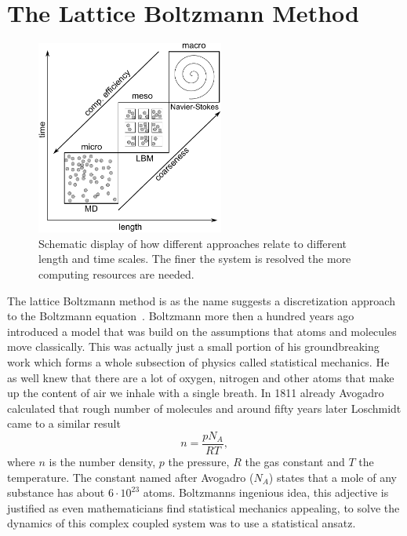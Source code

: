 \section{The Lattice Boltzmann Method}\label{sec:LBM}
\begin{figure}
    \centering
    \includegraphics[width=0.55\textwidth]{graphics/Scales_problem.pdf}
    \caption{Schematic display of how different approaches relate to different length and time scales.
    The finer the system is resolved the more computing resources are needed.}
    \label{fig:scales_dummy}
\end{figure}
The lattice Boltzmann method is as the name suggests a discretization approach to the Boltzmann equation~\cite{krugerLatticeBoltzmannMethod2017, succiLatticeBoltzmannEquation2001, wolf-gladrowLatticeGasCellularAutomata2004}.
Boltzmann more then a hundred years ago introduced a model that was build on the assumptions that atoms and molecules move classically.
This was actually just a small portion of his groundbreaking work which forms a whole subsection of physics called statistical mechanics. 
He as well knew that there are a lot of oxygen, nitrogen and other atoms that make up the content of air we inhale with a single breath.
In 1811 already Avogadro calculated that rough number of molecules and around fifty years later Loschmidt came to a similar result~\cite{avagadro1811essai, loschmidtZur1866}
\begin{equation}
    n = \frac{p N_A}{R T},
\end{equation}
where $n$ is the number density, $p$ the pressure, $R$ the gas constant and $T$ the temperature.
The constant named after Avogadro ($N_A$) states that a mole of any substance has about $6 \cdot 10^{23}$ atoms.
Boltzmanns ingenious idea, this adjective is justified as even mathematicians find statistical mechanics appealing, to solve the dynamics of this complex coupled system was to use a statistical ansatz.
